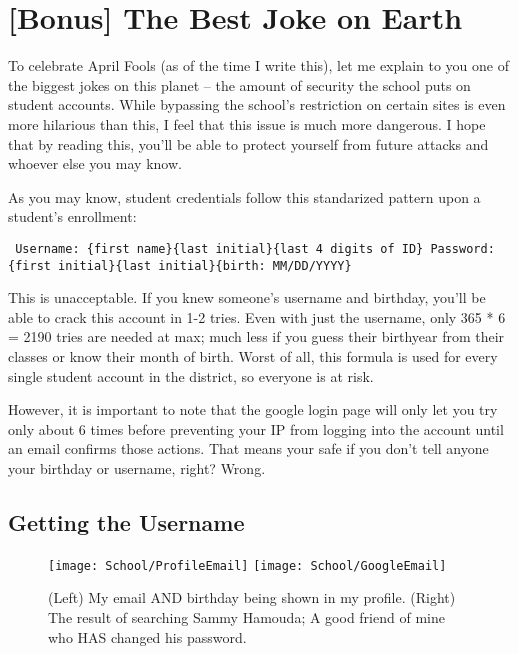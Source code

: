 \section{[Bonus] The Best Joke on Earth}

To celebrate April Fools (as of the time I write this), let me explain to you one of the biggest jokes on this planet -- the amount of security the school puts on student accounts. While bypassing the school's restriction on certain sites is even more hilarious than this, I feel that this issue is much more dangerous. I hope that by reading this, you'll be able to protect yourself from future attacks and whoever else you may know.

As you may know, student credentials follow this standarized pattern upon a student's enrollment:

\begin{centering}
\texttt{
Username: \{first name\}\{last initial\}\{last 4 digits of ID\} \newline
Password: \{first initial\}\{last initial\}\{birth: MM/DD/YYYY\}
}
\end{centering}

This is unacceptable. If you knew someone's username and birthday, you'll be able to crack this account in 1-2 tries. Even with just the username, only 365 * 6 = 2190 tries are needed at max; much less if you guess their birthyear from their classes or know their month of birth. Worst of all, this formula is used for every single student account in the district, so everyone is at risk.

However, it is important to note that the google login page will only let you try only about 6 times before preventing your IP from logging into the account until an email confirms those actions. That means your safe if you don't tell anyone your birthday or username, right? Wrong.

\subsection{Getting the Username}


\begin{figure}[h]
    \centering
    \texttt{[image: School/ProfileEmail]}
    \texttt{[image: School/GoogleEmail]}
    \caption{
        (Left) My email AND birthday being shown in my profile. (Right) The result of searching Sammy Hamouda; A good friend of mine who HAS changed his password.
    }
\end{figure}

